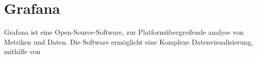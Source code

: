 \section{Grafana}
Grafana ist eine Open-Source-Software, zur Platformübergreifende analyse von Metriken und Daten. Die Software ermöglicht eine Komplexe Datenvisualisierung, mithilfe von  